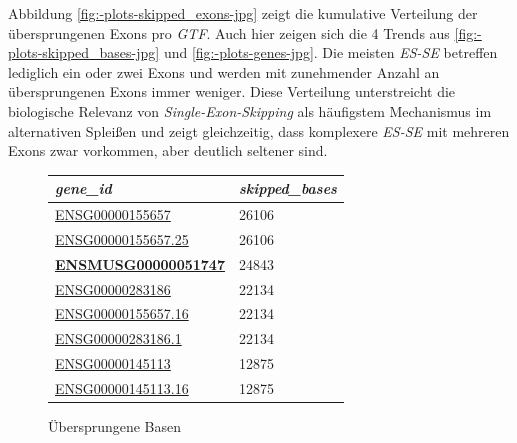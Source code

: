 \documentclass[12pt]{article}
\begin{document}
Abbildung \ref{fig:-plots-skipped_exons-jpg} zeigt die kumulative Verteilung der übersprungenen Exons pro \textit{GTF}.
Auch hier zeigen sich die 4 Trends aus \ref{fig:-plots-skipped_bases-jpg} und \ref{fig:-plots-genes-jpg}.
Die meisten \textit{ES-SE} betreffen lediglich ein oder zwei Exons und werden mit zunehmender Anzahl an
übersprungenen Exons immer weniger.
Diese Verteilung unterstreicht die biologische Relevanz von \textit{Single-Exon-Skipping} als häufigstem Mechanismus im alternativen
Spleißen und zeigt gleichzeitig, dass komplexere \textit{ES-SE} mit mehreren Exons zwar vorkommen,
aber deutlich seltener sind.

\begin{figure}[htbp]
	\centering
	\begin{minipage}{0.45\textwidth}
		\centering
		\caption{Übersprungene Basen}
		\begin{tabular}{l|l}
			\textit{\textbf{gene\_id}}                 & \textit{\textbf{skipped\_bases}} \\\hline
            \href{https://asia.ensembl.org/Homo_sapiens/Gene/Summary?db=core;g=ENSG00000155657;r=2:178525989-178830802}{ENSG00000155657}    & 26106               \\
            \href{https://asia.ensembl.org/Homo_sapiens/Gene/Summary?db=core;g=ENSG00000155657;r=2:178525989-178830802}{ENSG00000155657.25} & 26106               \\
            \href{https://asia.ensembl.org/Mus_musculus/Gene/Summary?db=core;g=ENSMUSG00000051747;r=2:76534324-76812891}{\textbf{ENSMUSG00000051747}} & 24843               \\
            \href{https://asia.ensembl.org/Homo_sapiens/Gene/Idhistory?g=ENSG00000283186}{ENSG00000283186}    & 22134               \\
            \href{https://asia.ensembl.org/Homo_sapiens/Gene/Summary?db=core;g=ENSG00000155657;r=2:178525989-178830802}{ENSG00000155657.16} & 22134               \\
            \href{https://asia.ensembl.org/Homo_sapiens/Gene/Idhistory?g=ENSG00000283186}{ENSG00000283186.1}  & 22134               \\
            \href{https://asia.ensembl.org/Homo_sapiens/Gene/Summary?db=core;g=ENSG00000145113;r=3:195746765-195811973}{ENSG00000145113}    & 12875               \\
            \href{https://asia.ensembl.org/Homo_sapiens/Gene/Summary?db=core;g=ENSG00000145113;r=3:195746765-195811973}{ENSG00000145113.16} & 12875               \\

\end{tabular}
\end{minipage}
\end{figure}
\end{document}
